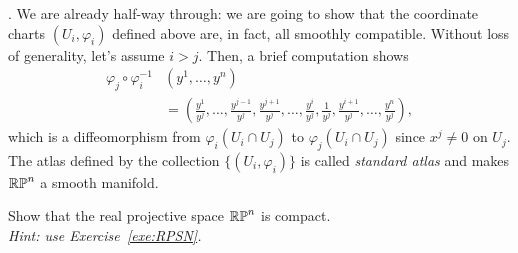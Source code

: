 \begin{example}
  .
  We are already half-way through: we are going to show that the coordinate charts $(U_i, \varphi_i)$ defined above are, in fact, all smoothly compatible.
  Without loss of generality, let's assume $i>j$.
  Then, a brief computation shows
  \begin{align}
    \varphi_j\circ\varphi_i^{-1} & (y^1, \ldots, y^n)                                                                                                                                             \\
                                 & = \left(\frac{y^1}{y^j},\ldots,\frac{y^{j-1}}{y^j},\frac{y^{j+1}}{y^j},\ldots,\frac{y^i}{y^j},\frac1{y^j},\frac{y^{i+1}}{y^j}, \ldots, \frac{y^n}{y^j}\right),
  \end{align}
  which is a diffeomorphism from $\varphi_i(U_i\cap U_j)$ to $\varphi_j(U_i\cap U_j)$ since $x^j\neq 0$ on $U_j$.
  The atlas defined by the collection $\{(U_i, \varphi_i)\}$ is called \emph{standard atlas} and makes $\mathbb{RP}^n$ a smooth manifold.
\end{example}

\begin{exercise}
  Show that the real projective space $\mathbb{RP}^n$ is compact.\\
  \textit{\small Hint: use Exercise~\ref{exe:RPSN}.}
\end{exercise}

